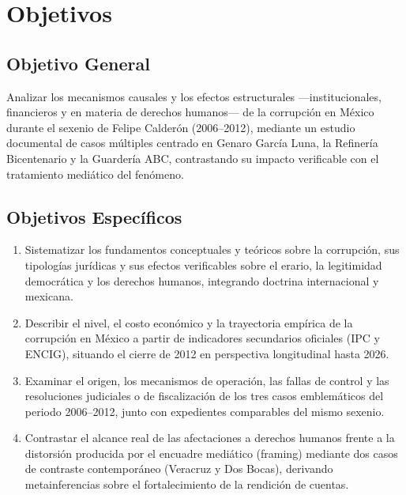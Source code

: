 \documentclass[12pt,letterpaper,oneside]{article}
\begin{document}
\clearpage

\section{Objetivos}

\subsection{Objetivo General}

Analizar los mecanismos causales y los efectos estructurales ---institucionales, financieros y en materia de derechos humanos--- de la corrupción en México durante el sexenio de Felipe Calderón (2006--2012), mediante un estudio documental de casos múltiples centrado en Genaro García Luna, la Refinería Bicentenario y la Guardería ABC, contrastando su impacto verificable con el tratamiento mediático del fenómeno.

\subsection{Objetivos Específicos}

\begin{enumerate}
  \item Sistematizar los fundamentos conceptuales y teóricos sobre la corrupción, sus tipologías jurídicas y sus efectos verificables sobre el erario, la legitimidad democrática y los derechos humanos, integrando doctrina internacional y mexicana.
  
  \item Describir el nivel, el costo económico y la trayectoria empírica de la corrupción en México a partir de indicadores secundarios oficiales (IPC y ENCIG), situando el cierre de 2012 en perspectiva longitudinal hasta 2026.
  
  \item Examinar el origen, los mecanismos de operación, las fallas de control y las resoluciones judiciales o de fiscalización de los tres casos emblemáticos del periodo 2006--2012, junto con expedientes comparables del mismo sexenio.
  
  \item Contrastar el alcance real de las afectaciones a derechos humanos frente a la distorsión producida por el encuadre mediático (framing) mediante dos casos de contraste contemporáneo (Veracruz y Dos Bocas), derivando metainferencias sobre el fortalecimiento de la rendición de cuentas.
\end{enumerate}
\end{document}
